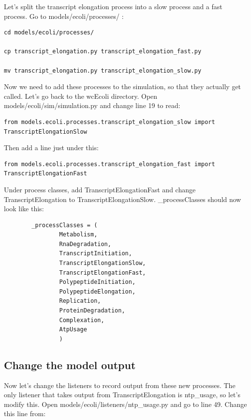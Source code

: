 \documentclass[12pt]{article}
\begin{document}
Let’s split the transcript elongation process into a slow process and a fast process. Go to models/ecoli/processes/ :

\lstset{language=bash}
\begin{lstlisting}
cd models/ecoli/processes/

cp transcript_elongation.py transcript_elongation_fast.py

mv transcript_elongation.py transcript_elongation_slow.py
\end{lstlisting}

Now we need to add these processes to the simulation, so that they actually get called. Let’s go back to the wcEcoli directory. Open models/ecoli/sim/simulation.py and change line 19 to read: 

\lstset{language=Python}
\begin{lstlisting}
from models.ecoli.processes.transcript_elongation_slow import TranscriptElongationSlow
\end{lstlisting}

Then add a line just under this:

\begin{lstlisting}
from models.ecoli.processes.transcript_elongation_fast import TranscriptElongationFast
\end{lstlisting}

Under process classes, add TranscriptElongationFast and change TranscriptElongation to TranscriptElongationSlow. \_processClasses should now look like this:


\begin{lstlisting}
        _processClasses = (
                Metabolism,
                RnaDegradation,
                TranscriptInitiation,
                TranscriptElongationSlow,
                TranscriptElongationFast,
                PolypeptideInitiation,
                PolypeptideElongation,
                Replication,
                ProteinDegradation,
                Complexation,
                AtpUsage
                )
\end{lstlisting}

\subsection{Change the model output}

Now let’s change the listeners to record output from these new processes. The only listener that takes output from TranscriptElongation is ntp\_usage, so let’s modify this. Open models/ecoli/listeners/ntp\_usage.py and go to line 49. Change this line from:
\end{document}

